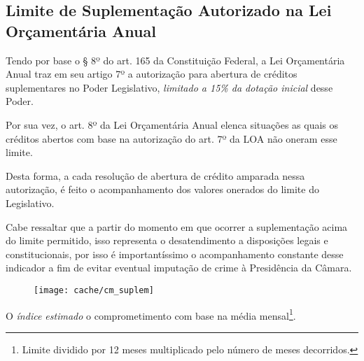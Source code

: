 
\subsection[Limite de Suplementação]{Limite de Suplementação Autorizado na Lei Orçamentária Anual}

Tendo por base o § 8º do art. 165 da Constituição Federal, a Lei Orçamentária Anual traz em seu artigo 7º a autorização para abertura de créditos suplementares no Poder Legislativo, \textit{limitado a 15\% da dotação inicial} desse Poder.

Por sua vez, o art. 8º da Lei Orçamentária Anual elenca situações as quais os créditos abertos com base na autorização do art. 7º da LOA não oneram esse limite.

Desta forma, a cada resolução de abertura de crédito amparada nessa autorização, é feito o acompanhamento dos valores onerados do limite do Legislativo.



Cabe ressaltar que a partir do momento em que ocorrer a suplementação acima do limite permitido, isso representa o desatendimento a disposições legais e constitucionais, por isso é importantíssimo o acompanhamento constante desse indicador a fim de evitar eventual imputação de crime à Presidência da Câmara.

\begin{figure}[H]
\center
\texttt{[image: cache/cm\_suplem]}
\end{figure}

O \textit{índice estimado} o comprometimento com base na média mensal\footnote{Limite dividido por 12 meses multiplicado pelo número de meses decorridos.}.